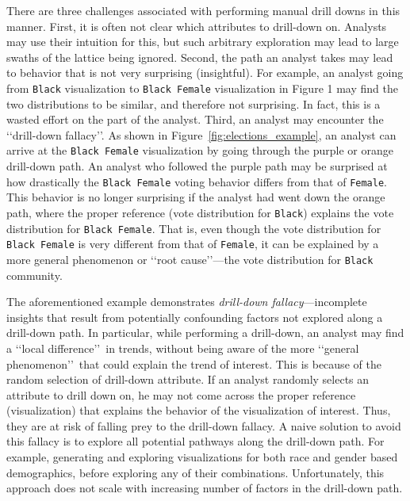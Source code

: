 There are three challenges associated with performing manual drill downs in this manner. First, it is often not clear which attributes to drill-down on. Analysts may use their intuition for this, but such arbitrary exploration may lead to large swaths of the lattice being ignored. Second, the path an analyst takes may lead to behavior that is not very surprising (insightful).  
For example, an analyst going from \texttt{Black} visualization to \texttt{Black Female} visualization in Figure 1 may find the two distributions to be similar, and therefore not surprising. In fact, this is a wasted effort on the part of the analyst. Third, an analyst may encounter the \lq\lq drill-down fallacy\rq\rq . As shown in Figure~\ref{fig:elections_example}, an analyst can arrive at the \texttt{Black Female} visualization by going through the purple or orange drill-down path. An analyst who followed the purple path may be surprised at how drastically the \texttt{Black Female} voting behavior differs from that of \texttt{Female}. This behavior is no longer surprising if the analyst had went down the orange path, where the proper reference (vote distribution for \texttt{Black}) explains the vote distribution for \texttt{Black Female}. That is, even though the vote distribution for 
\texttt{Black Female} is very different from that of \texttt{Female}, it can be explained by a more general phenomenon or \lq\lq root cause\rq\rq ---the vote distribution for \texttt{Black} community.

The aforementioned example demonstrates \emph{drill-down fallacy}---incomplete insights that result from potentially confounding factors not explored along a drill-down path. In particular, while performing a drill-down, an analyst may find a \lq\lq local difference\rq\rq\ in trends, without being aware of the more \lq\lq general phenomenon\rq\rq\ that could explain the trend of interest. This is because of the random selection of drill-down attribute. If an analyst randomly selects an attribute to drill down on, he may not come across the proper reference (visualization) that explains the behavior of the visualization of interest. Thus, they are at risk of falling prey to the drill-down fallacy. A naive solution to avoid this fallacy is to explore all potential pathways along the drill-down path. For example, generating and exploring visualizations for both race and gender based demographics, before exploring any of their combinations. Unfortunately, this approach does not scale with increasing number of factors in the drill-down path.

